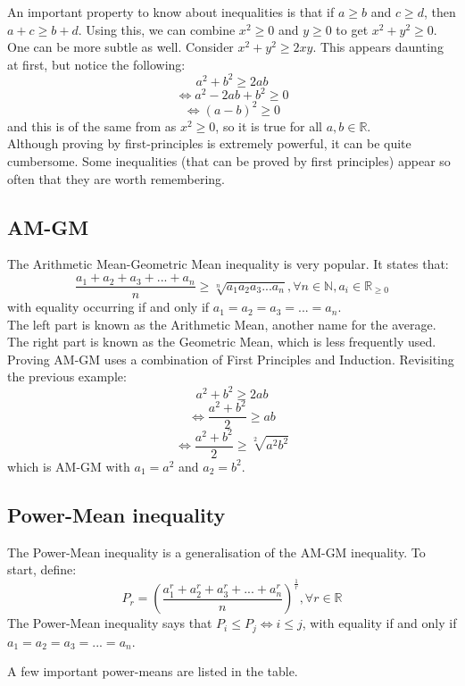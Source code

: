 \documentclass[a4paper,12pt]{article}
\begin{document}
An important property to know about inequalities is that if $a \geq b$ and $c \geq d$, then $a + c \geq b + d$. Using this, we can combine $x^2 \geq 0$ and $y \geq 0$ to get $x^2 + y^2 \geq 0$. One can be more subtle as well. Consider $x^2 + y^2 \geq 2xy$. This appears daunting at first, but notice the following:
$$a^2 + b^2 \geq 2ab$$
$$\iff a^2 - 2ab + b^2 \geq 0$$
$$\iff (a - b)^2 \geq 0$$
and this is of the same from as $x^2 \geq 0$, so it is true for all $a, b \in \mathbb{R}$. \\


Although proving by first-principles is extremely powerful, it can be quite cumbersome. Some inequalities (that can be proved by first principles) appear so often that they are worth remembering.

\subsection{AM-GM}
The Arithmetic Mean-Geometric Mean inequality is very popular. It states that:
$$\frac{a_1 + a_2 + a_3 + ... + a_n}{n} \geq \sqrt[n]{a_1a_2a_3...a_n}, \forall n \in \mathbb{N}, a_i \in \mathbb{R}_{\geq 0}$$
with equality occurring if and only if $a_1 = a_2 = a_3 = ... = a_n$.\\

The left part is known as the Arithmetic Mean, another name for the average. The right part is known as the Geometric Mean, which is less frequently used. Proving AM-GM uses a combination of First Principles and Induction.
Revisiting the previous example:
$$a^2 + b^2 \geq 2ab$$
$$\iff \frac{a^2 + b^2}{2} \geq ab$$
$$\iff \frac{a^2 + b^2}{2} \geq \sqrt[2]{a^2b^2}$$
which is AM-GM with $a_1 = a^2$ and $a_2 = b^2$. \\

\subsection{Power-Mean inequality}
The Power-Mean inequality is a generalisation of the AM-GM inequality. To start, define:
$$P_r = (\frac{a_1^r + a_2^r + a_3^r + ... + a_n^r}{n})^{\frac{1}{r}}, \forall r \in \mathbb{R}$$
The Power-Mean inequality says that $P_i \leq P_j \iff i \leq j$, with equality if and only if $a_1 = a_2 = a_3 = ... = a_n$.

A few important power-means are listed in the table. \\
\end{document}
